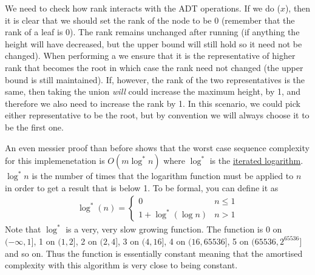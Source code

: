 We need to check how rank interacts with the ADT operations. If we do ($x$), then it is clear that we should set the rank of the node to be 0 (remember that the rank of a leaf is 0). The rank remains unchanged after running  (if anything the height will have decreased, but the upper bound will still hold so it need not be changed). When performing a  we ensure that it is the representative of higher rank that becomes the root in which case the rank need not changed (the upper bound is still maintained). If, however, the rank of the two representatives is the same, then taking the union \textit{will} could increase the maximum height, by 1, and therefore we also need to increase the rank by 1. In this scenario, we could pick either representative to be the root, but by convention we will always choose it to be the first one. 

An even messier proof than before shows that the worst case sequence complexity for this implemenetation is $O(m \log^* n)$ where $\log^*$ is the \href{https://en.wikipedia.org/wiki/Iterated_logarithm}{iterated logarithm}. $\log^* n$ is the number of times that the logarithm function must be applied to $n$ in order to get a result that is below 1. To be formal, you can define it as
\begin{align*}
    \log^*(n) = 
    \begin{cases}
    0 \ & n \leq 1\\
    1 + \log^*(\log n) & n > 1
    \end{cases}
\end{align*}
Note that $\log^*$ is a very, very slow growing function. The function is 0 on $(-\infty, 1]$, 1 on $(1, 2]$, 2 on $(2, 4]$, 3 on $(4, 16]$, 4 on $(16, 65536]$, 5 on $(65536, 2^{65536}]$ and so on. Thus the function is essentially constant meaning that the amortised complexity with this algorithm is very close to being constant.